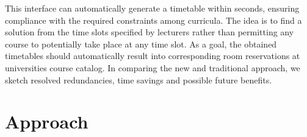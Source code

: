 \documentclass{easychair}
\begin{document}
  This interface can automatically generate a timetable within seconds, ensuring compliance with the required constraints among curricula. 
  The idea is to find a solution from the time slots specified by lecturers rather than permitting any course to potentially take place at any time slot.
  As a goal, the obtained timetables should automatically result into corresponding room reservations at universities course catalog.  
  In comparing the new and traditional approach, we sketch resolved redundancies, time savings and possible future benefits. 


\section{Approach}
\label{sec:approach}
\end{document}
